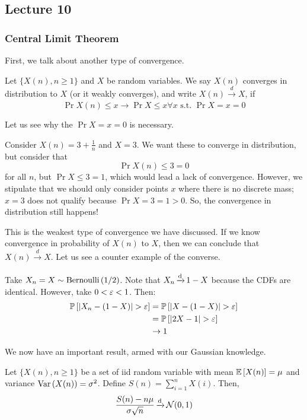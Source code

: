 \subsection{Lecture 10}

\subsubsection{Central Limit Theorem}
First, we talk about another type of convergence.
\begin{definition} 
    Let $\{X(n), n \geq 1\}$ and $X$ be random variables. We say $X(n)$ converges in distribution to $X$ (or it weakly converges), and write
    $X(n) \xrightarrow[]{d} X$, if
    \[ \Pr{X(n) \leq x} \to \Pr{X \leq x} \forall x \text{ s.t. } \Pr{X = x} = 0 \]
\end{definition}

Let us see why the $\Pr{X = x} = 0$ is necessary.
\begin{example}
    Consider $X(n) = 3 + \frac{1}{n}$ and $X = 3$. We want these to converge in distribution, but consider that
    \[ \Pr{X(n) \leq 3} = 0 \]
    for all $n$, but $\Pr{X \leq 3} = 1$, which would lead a lack of convergence. However,
    we stipulate that we should only consider points $x$ where there is no discrete mass; $x = 3$ does not
    qualify because $\Pr{X = 3} = 1 > 0$. So, the convergence in distribution still happens!
\end{example}

This is the weakest type of convergence we have discussed. If we know convergence in probability of $X(n)$ to $X$,
then we can conclude that $X(n) \xrightarrow[]{d} X$. Let us see a counter example of the converse.

\begin{example}
    Take $X_n = X \sim \text{Bernoulli}\left( 1/2 \right)$.
    Note that $X_n \operatorname{\xrightarrow[]{d}} 1 - X$ because the CDFs are identical. However, take $0 < \operatorname{\varepsilon} < 1$. Then:
    \begin{align*}
        \mathbb{P}\left[ \abs{X_n - (1 - X)} > \operatorname{\varepsilon} \right] &= \mathbb{P}\left[ \abs{X - (1 - X)} > \operatorname{\varepsilon} \right] \\
        &= \mathbb{P}\left[ \abs{2X - 1} > \operatorname{\varepsilon} \right] \\
        &\to 1
    \end{align*}
    
\end{example}

We now have an important result, armed with our Gaussian knowledge.

\begin{theorem}
    Let $\{X(n), n \geq 1\}$ be a set of iid random variable with mean $\mathbb{E}\left[ X(n) \right] = \mu$ and variance $\text{Var}\left( X(n) \right) = \sigma^2$.
    Define $S(n) = \sum_{i = 1}^n X(i)$.
    Then,
    \[ \frac{S(n) - n\mu}{\sigma \sqrt{n}} \operatorname{\xrightarrow[]{d}} \mathcal{N}(0, 1) \]
\end{theorem}

